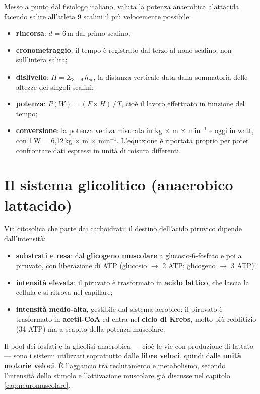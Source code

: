 Messo a punto dal fisiologo italiano, valuta la potenza anaerobica alattacida facendo salire
all'atleta 9 scalini il più velocemente possibile:
\begin{itemize}
  \item \textbf{rincorsa}: $d$ = 6\,m dal primo scalino;
  \item \textbf{cronometraggio}: il tempo è registrato dal terzo al nono scalino, non sull'intera
    salita;
  \item \textbf{dislivello}: $H = \Sigma_{3-9}\,h_{sc}$, la distanza verticale data dalla sommatoria
    delle altezze dei singoli scalini;
  \item \textbf{potenza}: $P(W) = (F \times H)\,/\,T$, cioè il lavoro effettuato in funzione del
    tempo;
  \item \textbf{conversione}: la potenza veniva misurata in kg $\times$ m $\times$ min$^{-1}$ e oggi
    in watt, con 1\,W = 6,12\,kg $\times$ m $\times$ min$^{-1}$. L'equazione è riportata proprio per
    poter confrontare dati espressi in unità di misura differenti.
\end{itemize}

\section{Il sistema glicolitico (anaerobico lattacido)}

Via citosolica che parte dai carboidrati; il destino dell'acido piruvico dipende dall'intensità:
\begin{itemize}
  \item \textbf{substrati e resa}: dal \textbf{glicogeno muscolare} a glucosio-6-fosfato e poi a
    piruvato, con liberazione di ATP (glucosio $\rightarrow$ 2 ATP; glicogeno $\rightarrow$ 3 ATP);
  \item \textbf{intensità elevata}: il piruvato è trasformato in \textbf{acido lattico}, che lascia
    la cellula e si ritrova nel capillare;
  \item \textbf{intensità medio-alta}, gestibile dal sistema aerobico: il piruvato è trasformato in
    \textbf{acetil-CoA} ed entra nel \textbf{ciclo di Krebs}, molto più redditizio (34 ATP) ma a
    scapito della potenza muscolare.
\end{itemize}

Il pool dei fosfati e la glicolisi anaerobica --- cioè le vie con produzione di lattato --- sono i
sistemi utilizzati soprattutto dalle \textbf{fibre veloci}, quindi dalle \textbf{unità motorie
veloci}. È l'aggancio tra reclutamento e metabolismo, secondo l'intensità dello stimolo e
l'attivazione muscolare già discusse nel capitolo \ref{cap:neuromuscolare}.

